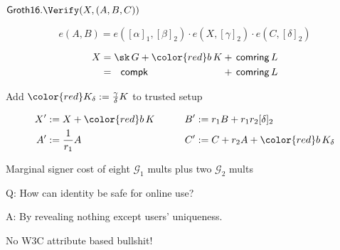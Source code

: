 \documentclass{beamer}
\def\comring{\ensuremath{\mathsf{comring}}\xspace}
\def\compk{\ensuremath{\mathsf{compk}}\xspace}
\begin{document}
\begin{frame}[t] %

$\mathsf{Groth16}.\Verify(X,(A,B,C))$

$$ e(A,B) = e([\alpha]_1, [\beta]_2) \cdot e(X, [\gamma]_2) \cdot e(C, [\delta]_2) $$

\smallskip

$$ \begin{alignedat}{2}
 X &= \sk \, G + {\color{red} b \, K} &&+ \, \comring \, L \\
   &= \, \, \, \, \compk  &&+ \, \comring \, L \\
\end{alignedat} $$

\bigskip

Add $\color{red} K_\delta := {\gamma\over\delta} K$ to trusted setup

$$ \begin{aligned}
X' &:= X + {\color{red} b\, K} &\quad&&
B' &:= r_1 B + r_1 r_2 [\delta]_2 \\
A' &:= {1 \over r_1} A & &&
C' &:= C + r_2 A + {\color{red} b\, K_\delta} \\
\end{aligned} $$

\bigskip\bigskip

\hspace{5pt} Marginal signer cost of eight $\mathcal{G}_1$ mults plus two $\mathcal{G}_2$ mults 


\end{frame}






\begin{frame} %
	
Q: How can identity be safe for online use?

\bigskip

A: By revealing nothing except users' uniqueness.

\bigskip\bigskip

\hspace{10pt} No W3C attribute based bullshit!

\end{frame}
\end{document}
